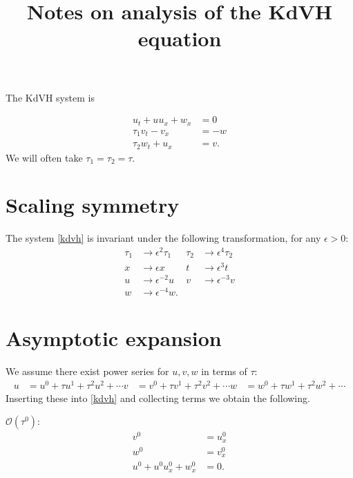 \documentclass{article}
\title{Notes on analysis of the KdVH equation}
\newcommand{\order}{{\mathcal O}}
\begin{document}
\maketitle

The KdVH system is

\begin{subequations} \label{kdvh}
\begin{align}
    u_t + uu_x + w_x & = 0 \\
    \tau_1 v_t - v_x & = -w \\
    \tau_2 w_t + u_x & = v.
\end{align}
\end{subequations}
We will often take $\tau_1 = \tau_2 = \tau$.

\section{Scaling symmetry}
The system \eqref{kdvh} is invariant under the following
transformation, for any $\epsilon>0$:
\begin{subequations}
\begin{align}
    \tau_1 & \to \epsilon^2 \tau_1 & \tau_2 & \to \epsilon^4 \tau_2 \\
    x & \to \epsilon x & t & \to \epsilon^3 t \\
    u & \to \epsilon^{-2} u & v & \to \epsilon^{-3} v \\
    w & \to \epsilon^{-4} w.
\end{align}
\end{subequations}


\section{Asymptotic expansion}
We assume there exist power series for $u, v, w$ in terms of $\tau$:
\begin{align}
    u & = u^0 + \tau u^1 + \tau^2 u^2 + \cdots
    v & = v^0 + \tau v^1 + \tau^2 v^2 + \cdots
    w & = w^0 + \tau w^1 + \tau^2 w^2 + \cdots
\end{align}
Inserting these into \eqref{kdvh} and collecting terms we obtain the following.

$\order(\tau^0)$:
\begin{subequations}
\begin{align}
    v^0 & = u^0_x \\
    w^0 & = v^0_x \\
    u^0 + u^0 u^0_x + w^0_x & = 0.
\end{align}
\end{subequations}
\end{document}
